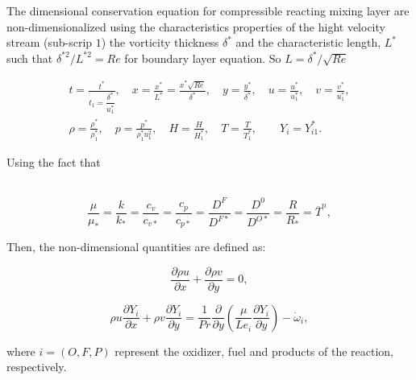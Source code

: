 The dimensional conservation equation 
for compressible reacting mixing layer are 
non-dimensionalized using  the characteristics 
properties of the hight velocity stream (sub-scrip $1$) 
the vorticity thickness $\delta^*$ and the characteristic length, $L^*$ 
such that $\delta^{*2}/L^{*2}=Re$ for boundary layer equation. 
So $L=\delta^*/\sqrt{Re}$

\begin{equation} 
\begin{split} 
    t=\frac{t^*}{t_1=\dfrac{\delta^*}{u_1^*}},
    \quad
    x=\frac{x^*}{L^*}=\frac{x^*\sqrt{Re}}{\delta^*},
    \quad
    y=\frac{y^*}{\delta^*},
    \quad
    u=\frac{u^*}{u_1^*},
    \quad
    v=\frac{v^*}{u_1^*},
    \\
    \rho=\frac{\rho^*}{\rho_1^*},
    \quad
    p=\frac{p^*}{\rho_1^*u_1^2},
    \quad
    H=\frac{H}{H_{1}^*}, 
    \quad
    T=\frac{T}{T_{1}^*}, 
    \qquad
    Y_i=Y^{*}_{i1}%
    .
\end{split} 
\end{equation}

Using the fact that 

\begin{equation}
\end{equation} 
\\
\begin{equation}
\frac{\mu}{\mu_{*}} =
\frac{k}{k_{*}} =
\frac{c_v}{c_{v*}} =
\frac{c_p}{c_{p*}} =
\frac{D^F}{D^{F*}}= 
\frac{D^0}{D^{O*}}= 
\frac{R}{R_*}= 
\overline{T}^n,
\end{equation} 

Then, the non-dimensional quantities are defined as:  

\begin{equation} 
\frac{\partial \rho u }{\partial x}+
\frac{\partial \rho v }{\partial y}
=0
,
\end{equation}


\begin{equation} 
\rho u\frac{\partial Y_{i}}{\partial x}+
\rho v\frac{\partial Y_{i}}{\partial y}
=
%
\frac{1}{Pr}
\frac{\partial}{\partial y}
\left(
    \frac{\mu}{Le_i}
    \frac{\partial Y_i}{\partial y}\right)
-
\dot{\omega}_i
,
\end{equation} 

where $i=(O,F,P)$ represent the oxidizer, fuel and products of the 
reaction, respectively. 



